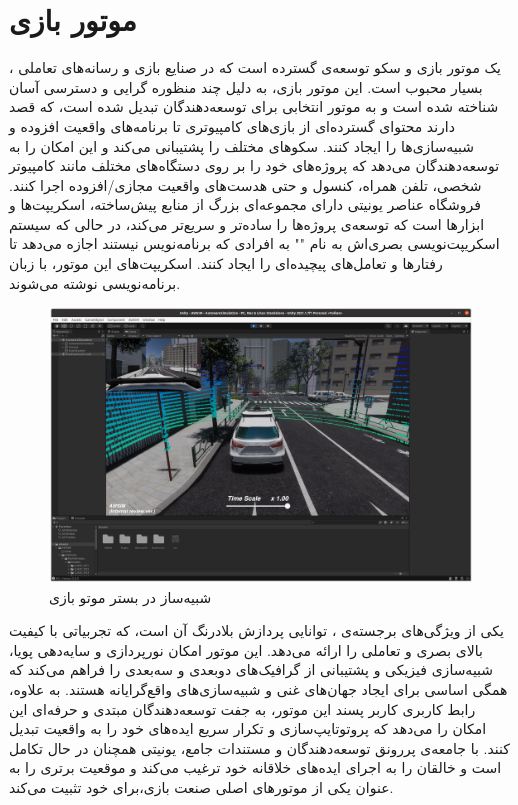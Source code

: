 \section{موتور بازی }
، یک موتور بازی و سکو توسعه‌ی گسترده است که در صنایع بازی و رسانه‌های تعاملی بسیار محبوب است. این موتور بازی، به دلیل چند منظوره گرایی و دسترسی آسان شناخته شده است و به موتور انتخابی برای توسعه‌دهندگان تبدیل شده است، که قصد دارند محتوای گسترده‌ای از بازی‌های کامپیوتری تا برنامه‌های واقعیت افزوده و شبیه‌سازی‌ها را ایجاد کنند.  سکو‌های مختلف را پشتیبانی می‌کند و این امکان را به توسعه‌دهندگان می‌دهد که پروژه‌های خود را بر روی دستگاه‌های مختلف مانند کامپیوتر شخصی، تلفن همراه، کنسول و حتی هدست‌های واقعیت مجازی/افزوده اجرا کنند. فروشگاه عناصر یونیتی دارای مجموعه‌ای بزرگ از منابع پیش‌ساخته، اسکریپت‌ها و ابزارها است که توسعه‌ی پروژه‌ها را ساده‌تر و سریع‌تر می‌کند، در حالی که سیستم اسکریپت‌نویسی بصری‌اش به نام "" به افرادی که برنامه‌نویس نیستند اجازه می‌دهد تا رفتارها و تعامل‌های پیچیده‌ای را ایجاد کنند. اسکریپت‌های این موتور، با زبان برنامه‌نویسی  نوشته می‌شوند.

\begin{figure}[h!]
    \centering
    \includegraphics[width=1\linewidth]{figures/Unity_Workspace.png}
    \caption{شبیه‌ساز  در بستر موتو بازی  \cite{AWSIM:Documentation}}
    \label{fig:Unity_Workspace}
\end{figure}

یکی از ویژگی‌های برجسته‌ی ، توانایی پردازش بلادرنگ آن است، که تجربیاتی با کیفیت بالای بصری و تعاملی را ارائه می‌دهد. این موتور امکان نورپردازی و سایه‌دهی پویا، شبیه‌سازی فیزیکی و پشتیبانی از گرافیک‌های دو‌بعدی و سه‌بعدی را فراهم می‌کند که همگی اساسی برای ایجاد جهان‌های غنی و شبیه‌سازی‌های واقع‌گرایانه هستند. به علاوه، رابط کاربری کاربر پسند این موتور، به جفت توسعه‌دهندگان مبتدی و حرفه‌ای این امکان را می‌دهد که پروتوتایپ‌سازی و تکرار سریع ایده‌های خود را به واقعیت تبدیل کنند. با جامعه‌ی پررونق توسعه‌دهندگان و مستندات جامع، یونیتی همچنان در حال تکامل است و خالقان را به اجرای ایده‌های خلاقانه خود ترغیب می‌کند و موقعیت برتری را به عنوان یکی از موتورهای اصلی صنعت بازی،‌برای خود تثبیت می‌کند.

